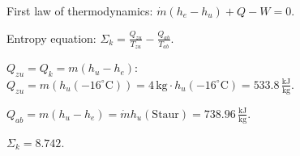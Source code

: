 First law of thermodynamics: \( \dot{m} (h_e - h_u) + Q - W = 0 \).  

Entropy equation:  
\( \Sigma_k = \frac{Q_{zu}}{T_{zu}} - \frac{Q_{ab}}{T_{ab}} \).  

\( Q_{zu} = Q_k = m (h_u - h_e) \):  
\( Q_{zu} = m (h_u (-16^\circ \text{C})) = 4 \, \text{kg} \cdot h_u (-16^\circ \text{C}) = 533.8 \, \frac{\text{kJ}}{\text{kg}} \).  

\( Q_{ab} = m (h_u - h_e) = \dot{m} h_u (\text{Staur}) = 738.96 \, \frac{\text{kJ}}{\text{kg}} \).  

\( \Sigma_k = 8.742 \).